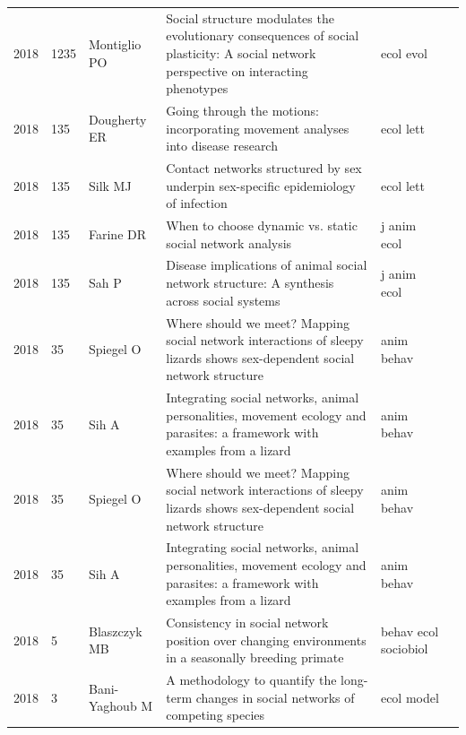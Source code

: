 \documentclass[11pt]{article} %
\begin{document}
\begin{landscape}
\begin{longtable}{p{0.7cm}|p{0.8cm}|p{3cm}|p{14.5cm}|p{3.5cm}l}
2018& 	1235& 	 Montiglio PO& 	 Social structure modulates the evolutionary consequences of social plasticity: A social network perspective on interacting phenotypes& 	 ecol evol\\
2018& 	135& 	 Dougherty ER& 	 Going through the motions: incorporating movement analyses into disease research& 	 ecol lett\\
2018& 	135& 	 Silk MJ& 	 Contact networks structured by sex underpin sex-specific epidemiology of infection& 	 ecol lett\\
2018& 	135& 	 Farine DR& 	 When to choose dynamic vs. static social network analysis& 	 j anim ecol\\
2018& 	135& 	 Sah P& 	 Disease implications of animal social network structure: A synthesis across social systems& 	 j anim ecol\\
2018& 	35& 	 Spiegel O& 	 Where should we meet? Mapping social network interactions of sleepy lizards shows sex-dependent social network structure& 	 anim behav\\
2018& 	35& 	 Sih A& 	 Integrating social networks, animal personalities, movement ecology and parasites: a framework with examples from a lizard& 	 anim behav\\
2018& 	35& 	 Spiegel O& 	 Where should we meet? Mapping social network interactions of sleepy lizards shows sex-dependent social network structure& 	 anim behav\\
2018& 	35& 	 Sih A& 	 Integrating social networks, animal personalities, movement ecology and parasites: a framework with examples from a lizard& 	 anim behav\\
2018& 	5& 	 Blaszczyk MB& 	 Consistency in social network position over changing environments in a seasonally breeding primate& 	 behav ecol sociobiol\\
2018& 	3& 	 Bani-Yaghoub M& 	 A methodology to quantify the long-term changes in social networks of competing species& 	 ecol model\\
\end{longtable}
\end{landscape}
\end{document}
